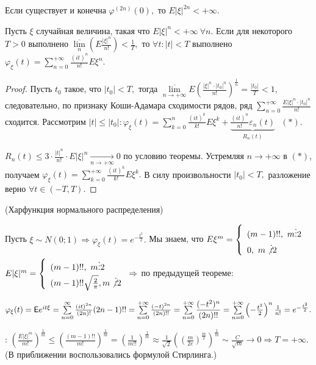 	\begin{property}[б/д]
		Если существует и конечна $\varphi^{(2n)}(0),$ то $E|\xi|^{2n} < +\infty.$
	\end{property}
	\begin{theorem}
		Пусть $\xi$ случайная величина, такая что $E|\xi|^n < +\infty~ \forall n.$ Если для некоторого $T > 0$ выполнено $\overline{\lim\limits_{n}}\left(E \frac{|\xi|^n}{n!}\right) < \frac{1}{T},$ то $\forall t: |t| < T$ выполнено $\varphi_\xi(t) = \sum\limits_{n = 0}^{+\infty} \frac{(it)^n}{n!}E\xi^n.$
		\begin{proof}
			Пусть $t_0$ такое, что $|t_0| < T, $ тогда $\overline{\lim\limits_{n \to +\infty}}E\left(\frac{|\xi|^n \cdot |t_0|^n}{n!}\right)^{\frac{1}{n}} = \frac{|t_0|}{T} < 1, $ следовательно, по признаку Коши-Адамара сходимости рядов, ряд $\sum\limits_{n = 0}^{+\infty} \frac{E|\xi|^n\cdot|t_0|^n}{n!}$ сходится.
			Рассмотрим $|t| \leqslant |t_0|: \varphi_\xi(t) = \sum\limits_{k = 0}^{n} \frac{(it)^k}{k!}E\xi^k + \underbrace{\frac{(it)^n}{n!}\varepsilon_n(t)}_{R_n(t)}~~~(*).$ 

			\noindent$R_n(t) \leqslant 3\cdot \frac{|t|^n}{n!}\cdot E|\xi|^n \underset{n \to +\infty}{\longrightarrow} 0$ по условию теоремы. Устремляя $n\to + \infty$ в $(*)$, получаем $\varphi_\xi(t) = \sum\limits_{k = 0}^{+\infty} \frac{(it)^k}{k!}E\xi^k.$ В силу произвольности $|t_0| < T,$ разложение верно $\forall t \in (-T, T).$
		\end{proof}
	\end{theorem}

	\begin{example} (Харфункция нормального распределения)
	
		Пусть $\xi \sim N(0;1) \Rightarrow \varphi_\xi(t) = e^{- \frac{t^2}{2}}.$ Мы знаем, что $E\xi^m = \left\{
			\begin{array}{l}
			(m-1)!!, ~m \vdots 2\\
			0, ~m\not \vdots 2
			\end{array}
		\right.$
		$E|\xi|^m = \left\{
			\begin{array}{l}
			(m - 1)!!, ~m \vdots 2\\
			(m - 1)!!\sqrt{\frac{2}{\pi}}, m \not \vdots 2
			\end{array}
		\right. \Rightarrow$ по предыдущей теореме:
		
		$\varphi_\xi(t) = \mathsf{E} e^{it\xi} = \sum\limits_{n = 0}^{\infty} \frac{(it)^{2n}}{(2n)!}(2n - 1)!! = \sum\limits_{n = 0}^{+\infty} \frac{(-t)^{2n}}{(2n)!!} = \sum\limits_{n = 0}^{+\infty} \dfrac{(- t^2)^n}{(2n)!!} = \sum\limits_{n = 0}^{+\infty} \left(- \frac{t^2}{2}\right)^n \frac{1}{n!} = e^{-\frac{t^2}{2}}.$

		\underline{}: $\left(\frac{E|\xi|^m}{m!}\right)^{\frac{1}{m}} \leqslant \left(\frac{(m - 1)!!}{m!}\right)^{\frac{1}{m}} = \left(\frac{1}{m!!}\right)^{\frac{1}{m}} \approx \frac{1}{\sqrt{2}}\left(\left(\frac{m}{2e}\right)^{\frac{m}{2}}\right)^{\frac{1}{m}} \sim \frac{C}{\sqrt{m}} \to 0 \Rightarrow T = + \infty.$ (В приближении воспользовались формулой Стирлинга.)
	\end{example}

